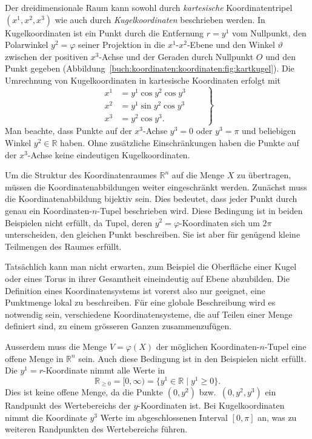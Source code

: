 \begin{beispiel}
\label{buch:koordinaten:koordinaten:beispiel:kartkugel}

Der dreidimensionale Raum kann sowohl durch {\em kartesische}
Koordinatentripel $(x^1,x^2,x^3)$ wie auch durch {\em Kugelkoordinaten}
%
beschrieben werden.
In Kugelkoordinaten ist ein Punkt durch die Entfernung $r=y^1$ vom
Nullpunkt, den Polarwinkel $y^2=\varphi$ seiner Projektion in die 
$x^1$-$x^2$-Ebene und den Winkel $\vartheta$ zwischen der positiven
$x^3$-Achse und der Geraden durch Nullpunkt $O$ und den Punkt gegeben
(Abbildung~\ref{buch:koordinaten:koordinaten:fig:kartkugel}).
Die Umrechnung von Kugelkoordinaten in kartesische Koordinaten
erfolgt mit
\begin{equation}
\left.
\begin{aligned}
x^1
&=
y^1 \cos y^2 \cos y^3 \\
x^2
&=
y^1 \sin y^2 \cos y^3 \\
x^3
&=
y^2 \cos y^3.
\end{aligned}
\qquad\right\}
\label{buch:koordinaten:koordinaten:eqn:kugelkartumrechnung}
\end{equation}
Man beachte, dass Punkte auf der $x^3$-Achse $y^3=0$ oder
$y^3=\pi$ und beliebigen Winkel $y^2\in\mathbb{R}$ haben.
Ohne zusätzliche Einschränkungen haben die Punkte auf der
$x^3$-Achse keine eindeutigen Kugelkoordinaten.
\end{beispiel}

Um die Struktur des Koordinatenraumes $\mathbb{R}^n$ auf die Menge
$X$ zu übertragen, müssen die Koordinatenabbildungen weiter eingeschränkt
werden.
Zunächst muss die Koordinatenabbildung bijektiv sein.
Dies bedeutet, dass jeder Punkt durch genau ein Koordinaten-$n$-Tupel
beschrieben wird.
Diese Bedingung ist in beiden Beispielen nicht erfüllt, da Tupel,
deren $y^2=\varphi$-Koordinaten sich um $2\pi$ unterscheiden, den
gleichen Punkt beschreiben.
Sie ist aber für genügend kleine Teilmengen des Raumes erfüllt.

Tatsächlich kann man nicht erwarten, zum Beispiel die Oberfläche einer
Kugel oder eines Torus in ihrer Gesamtheit eineindeutig auf Ebene
abzubilden.
Die Definition eines Koordinatensystems ist vorerst also nur geeignet,
eine Punktmenge lokal zu beschreiben.
Für eine globale Beschreibung wird es notwendig sein, verschiedene
Koordinatensysteme, die auf Teilen einer Menge definiert sind, zu
einem grösseren Ganzen zusammenzufügen.

Ausserdem muss die Menge $V=\varphi(X)$ der möglichen Koordinaten-$n$-Tupel
eine offene Menge in $\mathbb{R}^n$ sein.
Auch diese Bedingung ist in den Beispielen nicht erfüllt.
Die $y^1=r$-Koordinate nimmt alle Werte in
\[
\mathbb{R}_{\ge 0}
=
[0,\infty)
=
\{
y^1\in\mathbb{R}
\mid
y^1\ge 0
\}.
\]
Dies ist keine offene Menge, da die Punkte $(0,y^2)$ bzw.~$(0,y^2,y^3)$
ein Randpunkt des Wertebereichs der $y$-Koordinaten ist.
Bei Kugelkoordinaten nimmt die Koordinate $y^3$ Werte im
abgeschlossenen Interval $[0,\pi]$ an, was zu weiteren Randpunkten
des Wertebereichs führen.

